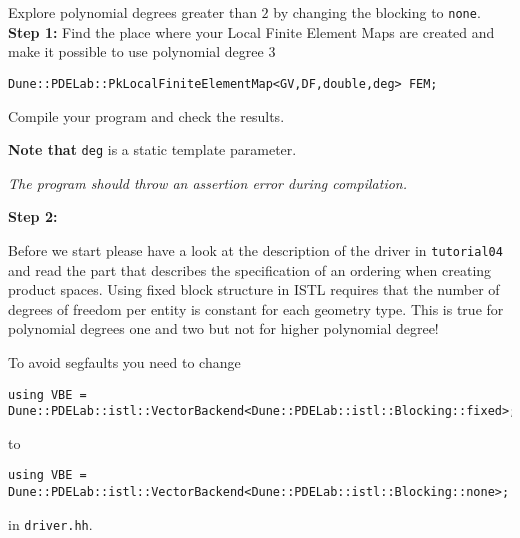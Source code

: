 \documentclass[12pt,a4paper]{article}
\begin{document}
\begin{Exercise}{Explore polynomial degrees greater than $2$ by
    changing the blocking to \lstinline{none}.}
  \textbf{Step 1:} Find the place where your Local Finite Element Maps
  are created and make it possible to use polynomial degree 3

  \begin{lstlisting}
Dune::PDELab::PkLocalFiniteElementMap<GV,DF,double,deg> FEM;
  \end{lstlisting}

  Compile your program and check the results.

  \textbf{Note that} \lstinline!deg! is a static template parameter.

  \textit{The program should throw an assertion error during compilation.}

  \textbf{Step 2:}

  Before we start please have a look at the description of the driver
  in \lstinline!tutorial04! and read the part that describes the
  specification of an ordering when creating product spaces. Using
  fixed block structure in ISTL requires that the number of degrees of
  freedom per entity is constant for each geometry type. This is true
  for polynomial degrees one and two but not for higher polynomial
  degree!

  To avoid segfaults you need to change
  \begin{lstlisting}
using VBE = Dune::PDELab::istl::VectorBackend<Dune::PDELab::istl::Blocking::fixed>;
  \end{lstlisting}
  to
  \begin{lstlisting}
using VBE = Dune::PDELab::istl::VectorBackend<Dune::PDELab::istl::Blocking::none>;
  \end{lstlisting}
  in  \lstinline!driver.hh!.
\end{Exercise}
\end{document}
